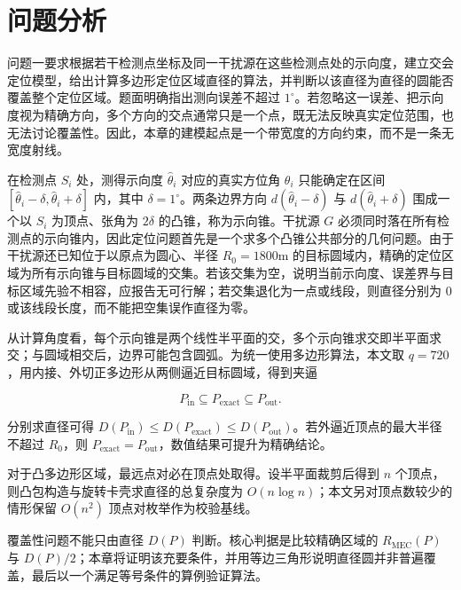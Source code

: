 
\section{问题分析}

问题一要求根据若干检测点坐标及同一干扰源在这些检测点处的示向度，建立交会定位模型，给出计算多边形定位区域直径的算法，并判断以该直径为直径的圆能否覆盖整个定位区域。题面明确指出测向误差不超过 $1^\circ$。若忽略这一误差、把示向度视为精确方向，多个方向的交点通常只是一个点，既无法反映真实定位范围，也无法讨论覆盖性。因此，本章的建模起点是一个带宽度的方向约束，而不是一条无宽度射线。

在检测点 $S_i$ 处，测得示向度 $\hat\theta_i$ 对应的真实方位角 $\theta_i$ 只能确定在区间 $[\hat\theta_i-\delta,\hat\theta_i+\delta]$ 内，其中 $\delta=1^\circ$。两条边界方向 $d(\hat\theta_i-\delta)$ 与 $d(\hat\theta_i+\delta)$ 围成一个以 $S_i$ 为顶点、张角为 $2\delta$ 的凸锥，称为示向锥。干扰源 $G$ 必须同时落在所有检测点的示向锥内，因此定位问题首先是一个求多个凸锥公共部分的几何问题。由于干扰源还已知位于以原点为圆心、半径 $R_0=1800\mathrm{m}$ 的目标圆域内，精确的定位区域为所有示向锥与目标圆域的交集。若该交集为空，说明当前示向度、误差界与目标区域先验不相容，应报告无可行解；若交集退化为一点或线段，则直径分别为 $0$ 或该线段长度，而不能把空集误作直径为零。

从计算角度看，每个示向锥是两个线性半平面的交，多个示向锥求交即半平面求交；与圆域相交后，边界可能包含圆弧。为统一使用多边形算法，本文取 $q=720$，用内接、外切正多边形从两侧逼近目标圆域，得到夹逼

\[
P_{\mathrm{in}}\subseteq P_{\mathrm{exact}}\subseteq P_{\mathrm{out}}.
\]

分别求直径可得 $D(P_{\mathrm{in}})\le D(P_{\mathrm{exact}})\le D(P_{\mathrm{out}})$。若外逼近顶点的最大半径不超过 $R_0$，则 $P_{\mathrm{exact}}=P_{\mathrm{out}}$，数值结果可提升为精确结论。

对于凸多边形区域，最远点对必在顶点处取得。设半平面裁剪后得到 $n$ 个顶点，则凸包构造与旋转卡壳求直径的总复杂度为 $O(n\log n)$；本文另对顶点数较少的情形保留 $O(n^2)$ 顶点对枚举作为校验基线。

覆盖性问题不能只由直径 $D(P)$ 判断。核心判据是比较精确区域的 $R_{\mathrm{MEC}}(P)$ 与 $D(P)/2$；本章将证明该充要条件，并用等边三角形说明直径圆并非普遍覆盖，最后以一个满足等号条件的算例验证算法。

